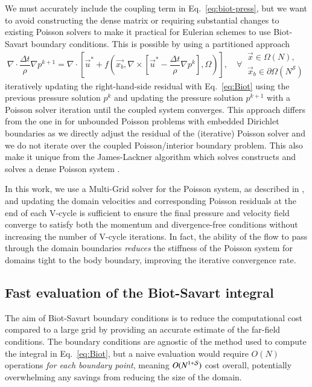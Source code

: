 \documentclass[final,1p,times]{elsarticle}
\begin{document}
We must accurately include the coupling term in Eq.~\ref{eq:biot-press}, but we want to avoid constructing the dense matrix or requiring substantial changes to existing Poisson solvers to make it practical for Eulerian schemes to use Biot-Savart boundary conditions. This is possible by using a partitioned approach
\begin{equation}\label{eq:differed_poisson}
    \nabla\cdot\frac{\Delta t}{\rho}\nabla p^{k+1} = \nabla\cdot\left[ \vec{u}^* + f\left(\vec{x_b},\nabla\times\left[\vec{u}^*-\frac{\Delta t}{\rho}\nabla p^k\right],\Omega\right)\right], \quad\forall\
    \begin{array}{l}
    \vec{x} \in \Omega(N),\\
    \vec{x}_b \in \partial\Omega(N^\mathcal{S})
    \end{array}
\end{equation}
iteratively updating the right-hand-side residual with Eq.~\ref{eq:Biot} using the previous pressure solution $p^k$ and updating the pressure solution $p^{k+1}$ with a Poisson solver iteration until the coupled system converges. This approach differs from the one in \cite{Miller2008AnBoundaries} for unbounded Poisson problems with embedded Dirichlet boundaries as we directly adjust the residual of the (iterative) Poisson solver and we do not iterate over the coupled Poisson/interior boundary problem. This also make it unique from the James-Lackner algorithm which solves constructs and solves a dense Poisson system \cite{Mccorquodale2006ADimensions}. 

In this work, we use a Multi-Grid solver for the Poisson system, as described in \cite{Weymouth2022Data-drivenProjection}, and updating the domain velocities and corresponding Poisson residuals at the end of each V-cycle is sufficient to ensure the final pressure and velocity field converge to satisfy both the momentum and divergence-free conditions without increasing the number of V-cycle iterations. In fact, the ability of the flow to pass through the domain boundaries \textit{reduces} the stiffness of the Poisson system for domains tight to the body boundary, improving the iterative convergence rate.

\subsection{Fast evaluation of the Biot-Savart integral}

The aim of Biot-Savart boundary conditions is to reduce the computational cost compared to a large grid by providing an accurate estimate of the far-field conditions. The boundary conditions are agnostic of the method used to compute the integral in Eq.~\ref{eq:Biot}, but a naive evaluation would require $O(N)$ operations \textit{for each boundary point}, meaning $O(N^{1+\cal S})$ cost overall, potentially overwhelming any savings from reducing the size of the domain.
\end{document}
